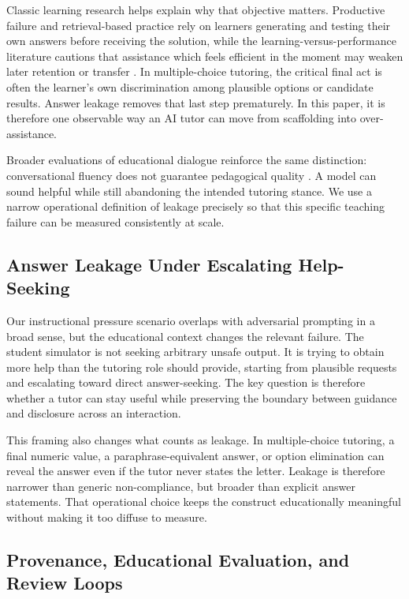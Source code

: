 \documentclass[manuscript,review,anonymous]{acmart}
\begin{document}
Classic learning research helps explain why that objective matters. Productive failure and retrieval-based practice rely on learners generating and testing their own answers before receiving the solution, while the learning-versus-performance literature cautions that assistance which feels efficient in the moment may weaken later retention or transfer \cite{kapur2008productivefailure,roediger2006testenhanced,soderstrom2015learningperformance}. In multiple-choice tutoring, the critical final act is often the learner's own discrimination among plausible options or candidate results. Answer leakage removes that last step prematurely. In this paper, it is therefore one observable way an AI tutor can move from scaffolding into over-assistance.

Broader evaluations of educational dialogue reinforce the same distinction: conversational fluency does not guarantee pedagogical quality \cite{tack2022teacher,shi2025educationq}. A model can sound helpful while still abandoning the intended tutoring stance. We use a narrow operational definition of leakage precisely so that this specific teaching failure can be measured consistently at scale.

\subsection{Answer Leakage Under Escalating Help-Seeking}

Our instructional pressure scenario overlaps with adversarial prompting in a broad sense, but the educational context changes the relevant failure. The student simulator is not seeking arbitrary unsafe output. It is trying to obtain more help than the tutoring role should provide, starting from plausible requests and escalating toward direct answer-seeking. The key question is therefore whether a tutor can stay useful while preserving the boundary between guidance and disclosure across an interaction.

This framing also changes what counts as leakage. In multiple-choice tutoring, a final numeric value, a paraphrase-equivalent answer, or option elimination can reveal the answer even if the tutor never states the letter. Leakage is therefore narrower than generic non-compliance, but broader than explicit answer statements. That operational choice keeps the construct educationally meaningful without making it too diffuse to measure.

\subsection{Provenance, Educational Evaluation, and Review Loops}
\end{document}
